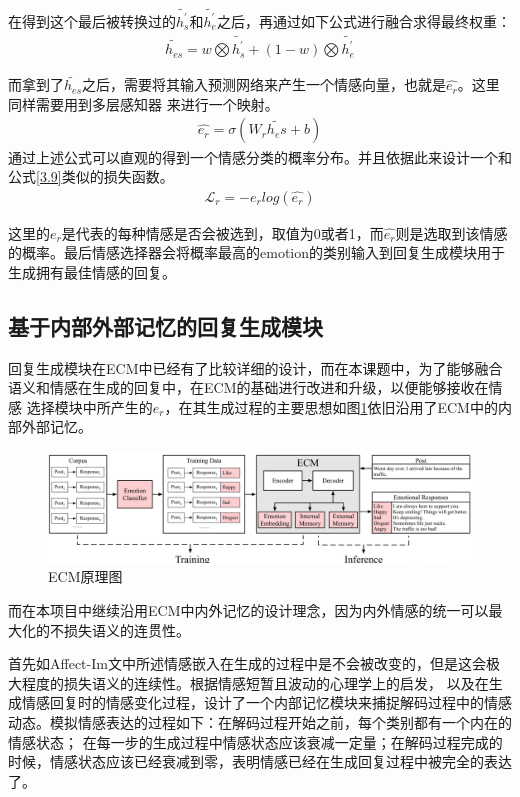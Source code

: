 \documentclass[supercite]{HustGraduPaper}
\theoremstyle{definition}
\begin{document}
在得到这个最后被转换过的$\widetilde{h_s^{'}}$和$\widetilde{h_e^{'}}$之后，再通过如下公式进行融合求得最终权重：
\begin{align}
  {\widetilde{h_{es}}} = w \bigotimes {\widetilde{h_s^{'}}} + (1 - w) \bigotimes {\widetilde{h_e^{'}}} \label{3.13}
\end{align}

而拿到了$\widetilde{h_{es}}$之后，需要将其输入预测网络来产生一个情感向量，也就是$\hat{e_r}$。这里同样需要用到多层感知器
来进行一个映射。
\begin{align}
  \hat{e_r} = \sigma(W_r \widetilde{h_es} + b) \label{3.14}
\end{align}
通过上述公式可以直观的得到一个情感分类的概率分布。并且依据此来设计一个和公式\ref{3.9}类似的损失函数。
\begin{align}
  \mathcal{L}_r = -e_r log(\hat{e_r}) \label{3.15} 
\end{align}

这里的$e_r$是代表的每种情感是否会被选到，取值为0或者1，而$\hat{e_r}$则是选取到该情感的概率。最后情感选择器会将概率最高的emotion的类别输入到回复生成模块用于生成拥有最佳情感的回复。

\subsection{基于内部外部记忆的回复生成模块}
回复生成模块在ECM\cite{DBLP:journals/corr/ZhouHZZL17}中已经有了比较详细的设计，而在本课题中，为了能够融合语义和情感在生成的回复中，在ECM的基础进行改进和升级，以便能够接收在情感
选择模块中所产生的$e_r$，在其生成过程的主要思想如图\ref{Fig.ECM}依旧沿用了ECM中的内部外部记忆。
\begin{figure}[htbp] %
  \centering %
  \includegraphics[width=1\textwidth]{images/ECM.png} %
  \caption{ECM原理图} %
  \label{Fig.ECM} %
\end{figure}
而在本项目中继续沿用ECM中内外记忆的设计理念，因为内外情感的统一可以最大化的不损失语义的连贯性。

首先如Affect-Im\cite{ghosh2017affect}文中所述情感嵌入在生成的过程中是不会被改变的，但是这会极大程度的损失语义的连续性。根据情感短暂且波动的心理学上的启发，
以及在生成情感回复时的情感变化过程，设计了一个内部记忆模块来捕捉解码过程中的情感动态。模拟情感表达的过程如下：在解码过程开始之前，每个类别都有一个内在的情感状态；
在每一步的生成过程中情感状态应该衰减一定量；在解码过程完成的时候，情感状态应该已经衰减到零，表明情感已经在生成回复过程中被完全的表达了。
\end{document}
